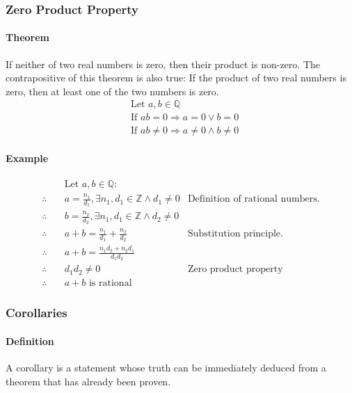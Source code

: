 \subsubsection*{Zero Product Property}
\paragraph*{Theorem}
If neither of two real numbers is zero, then their product is non-zero. The contrapositive of this theorem is also true: If the product of two real numbers is zero, then at least one of the two numbers is zero.
\begin{align*}
    &\text{Let } a,b \in \mathbb{Q}\\
    &\text{If } ab = 0 \Rightarrow a = 0 \lor b = 0\\
    &\text{If } ab \neq 0 \Rightarrow a \neq 0 \land b \neq 0
\end{align*}

\paragraph*{Example}
\begin{align*}
    &\text{Let } a,b \in \mathbb{Q}:\\
    \therefore \quad & a = \frac{n_1}{d_1}, \exists n_1,d_1 \in \mathbb{Z} \land d_1 \neq 0 & \text{Definition of rational numbers.}\\
    \therefore \quad & b = \frac{n_2}{d_2}, \exists n_1,d_1 \in \mathbb{Z} \land d_2 \neq 0\\
    \therefore \quad & a + b = \frac{n_1}{d_1} + \frac{n_2}{d_2} & \text{Substitution principle.}\\
    \therefore \quad & a + b = \frac{n_1d_2 + n_2d_1}{d_1d_2}\\
    \therefore \quad & d_1d_2 \neq 0 & \text{Zero product property}\\
    \therefore \quad & a + b \text{ is rational}
\end{align*}

\subsubsection*{Corollaries}
\paragraph*{Definition}
A corollary is a statement whose truth can be immediately deduced from a theorem that has already been proven.

